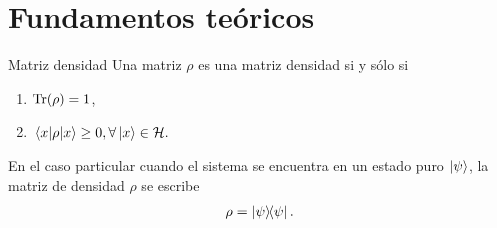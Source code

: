 \documentclass[xcolor=dvipsnames,presentation]{beamer}%
\begin{document}
\section{Fundamentos teóricos}
\begin{frame}{Matriz  densidad}
Una matriz $\rho$ es una matriz densidad si y sólo si
	\begin{enumerate}
		\item $\Tr (\rho)=1$,
		\item $\matrixel{x}{\rho}{x}\geq 0, \forall \ket{x} \in \mathcal{H}.$
	\end{enumerate}	\vfill

	En el caso particular cuando el sistema se encuentra en un estado
	puro $\ket{\psi}$, la matriz de densidad $\rho$ se escribe
  \begin{align*}
  \rho=\dyad{\psi}{\psi}.
  \end{align*}
\end{frame}
\end{document}
